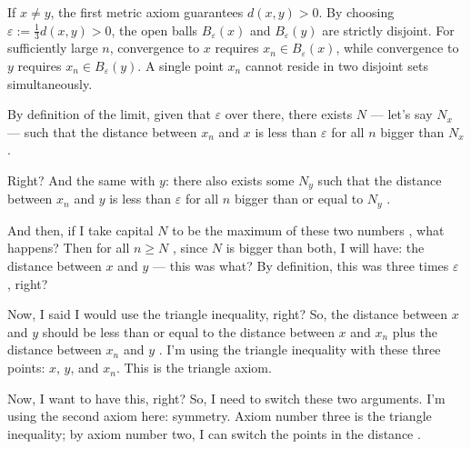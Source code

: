 \begin{proofWrapper}
\begin{content}
\begin{steps}
If $x \neq y$, the first metric axiom guarantees $d(x, y) > 0$. By choosing $\varepsilon := \frac{1}{3} d(x, y) > 0$, the open balls $B_\varepsilon(x)$ and $B_\varepsilon(y)$ are strictly disjoint. For sufficiently large $n$, convergence to $x$ requires $x_n \in B_\varepsilon(x)$, while convergence to $y$ requires $x_n \in B_\varepsilon(y)$. A single point $x_n$ cannot reside in two disjoint sets simultaneously.
\end{steps}
\end{content}

\begin{speech}[00:11:04 - 00:12:40]
By definition of the limit, given that $\varepsilon$ over there, there exists $N$ --- let's say $N_x$ --- such that  the distance between $x_n$ and $x$ is less than $\varepsilon$ for all $n$ bigger than $N_x$ .

Right? And the same with $y$: there also exists some $N_y$ such that the distance between $x_n$ and $y$ is less than $\varepsilon$ for all $n$ bigger than or equal to $N_y$ .

And then, if I take capital $N$ to be the maximum of these two numbers , what happens? Then for all $n \ge N$ , since $N$ is bigger than both, I will have: the distance between $x$ and $y$ --- this was what? By definition, this was three times $\varepsilon$ , right?
\end{speech}

\begin{speech}[00:12:40 - 00:14:15]
Now, I said I would use the triangle inequality, right? So, the distance between $x$ and $y$ should be less than or equal to the distance between $x$ and $x_n$ plus the distance between $x_n$ and $y$ . I'm using the triangle inequality with these three points: $x$, $y$, and $x_n$. This is the triangle axiom.

Now, I want to have this, right? So, I need to switch these two arguments. I'm using the second axiom here: symmetry. Axiom number three is the triangle inequality; by axiom number two, I can switch the points in the distance .


\end{speech}
\end{proofWrapper}
